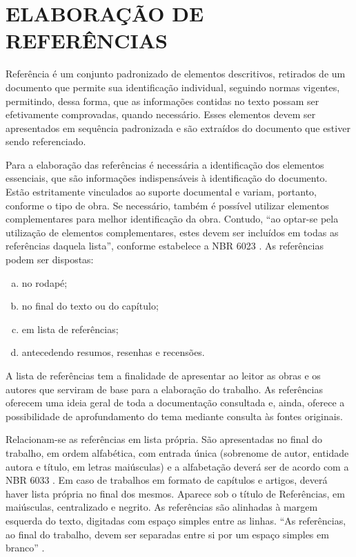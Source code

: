 \chapter{ELABORAÇÃO DE REFERÊNCIAS}
\label{sec: referencias}

Referência é um conjunto padronizado de elementos descritivos, retirados de um documento que permite sua identificação individual, seguindo normas vigentes, permitindo, dessa forma, que as informações contidas no texto possam ser efetivamente comprovadas, quando necessário. Esses elementos devem ser apresentados em sequência padronizada e são extraídos do documento que estiver sendo referenciado.

Para a elaboração das referências é necessária a identificação dos elementos essenciais, que são informações indispensáveis à identificação do documento. Estão estritamente vinculados ao suporte documental e variam, portanto, conforme o tipo de obra. Se necessário, também é possível utilizar elementos complementares para melhor identificação da obra. Contudo, ``ao optar-se pela utilização de elementos complementares, estes devem ser incluídos em todas as referências daquela lista'', conforme estabelece a NBR 6023 \cite{NBR6023:2002}. As referências podem ser dispostas:

\begin{enumerate}[a)]
  \item	 no rodapé;
  \item	 no final do texto ou do capítulo;
  \item	 em lista de referências;
  \item	 antecedendo resumos, resenhas e recensões.
\end{enumerate}

A lista de referências tem a finalidade de apresentar ao leitor as obras e os autores que serviram de base para a elaboração do trabalho. As referências oferecem uma ideia geral de toda a documentação consultada e, ainda, oferece a possibilidade de aprofundamento do tema mediante consulta às fontes originais. 

Relacionam-se as referências em lista própria. São apresentadas no final do trabalho, em ordem alfabética, com entrada única (sobrenome de autor, entidade autora e título, em letras maiúsculas) e a alfabetação deverá ser de acordo com a NBR 6033 \cite{NBR6033:1989}. Em caso de trabalhos em formato de capítulos e artigos, deverá haver lista própria no final dos mesmos. Aparece sob o título de Referências, em maiúsculas, centralizado e negrito. As referências são alinhadas à margem esquerda do texto, digitadas com espaço simples entre as linhas. ``As referências, ao final do trabalho, devem ser separadas entre si por um espaço simples em branco'' \cite[p.10]{NBR14724:2011}.

